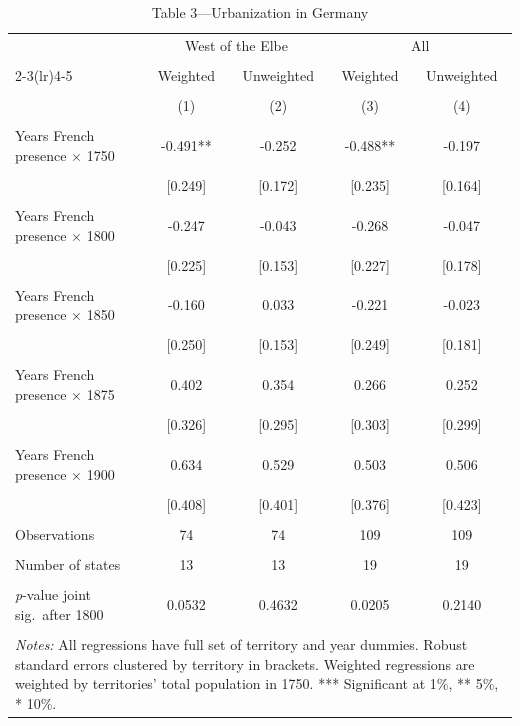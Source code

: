 \begin{table}[htbp]
\centering
\caption{Table 3---Urbanization in Germany}
\label{tab:table3}
\begin{tabular}{lcccc}
\toprule
 & \multicolumn{2}{c}{West of the Elbe} & \multicolumn{2}{c}{All} \\\\
\cmidrule(lr){2-3}\cmidrule(lr){4-5}
 & Weighted & Unweighted & Weighted & Unweighted \\\\
 & (1) & (2) & (3) & (4) \\\\
\midrule
Years French presence $\times$ 1750 & -0.491** & -0.252 & -0.488** & -0.197 \\\\
 & [0.249] & [0.172] & [0.235] & [0.164] \\\\
\addlinespace
Years French presence $\times$ 1800 & -0.247 & -0.043 & -0.268 & -0.047 \\\\
 & [0.225] & [0.153] & [0.227] & [0.178] \\\\
\addlinespace
Years French presence $\times$ 1850 & -0.160 & 0.033 & -0.221 & -0.023 \\\\
 & [0.250] & [0.153] & [0.249] & [0.181] \\\\
\addlinespace
Years French presence $\times$ 1875 & 0.402 & 0.354 & 0.266 & 0.252 \\\\
 & [0.326] & [0.295] & [0.303] & [0.299] \\\\
\addlinespace
Years French presence $\times$ 1900 & 0.634 & 0.529 & 0.503 & 0.506 \\\\
 & [0.408] & [0.401] & [0.376] & [0.423] \\\\
\addlinespace[6pt]
Observations & 74 & 74 & 109 & 109 \\\\
Number of states & 13 & 13 & 19 & 19 \\\\
\textit{p}-value joint sig.\ after 1800 & 0.0532 & 0.4632 & 0.0205 & 0.2140 \\\\
\bottomrule
\multicolumn{5}{p{0.95\linewidth}}{\footnotesize
 \textit{Notes:} All regressions have full set of territory and year dummies.
 Robust standard errors clustered by territory in brackets.
 Weighted regressions are weighted by territories' total population in 1750.
 *** Significant at 1\%, ** 5\%, * 10\%.}
\end{tabular}
\end{table}
